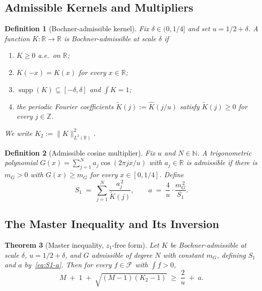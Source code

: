 \documentclass[11pt, letterpaper]{article}
\theoremstyle{paperplain}
\newtheorem{theorem}{Theorem}[section]
\theoremstyle{paperdef}
\newtheorem{definition}[theorem]{Definition}
\newcommand{\R}{\mathbb{R}}
\newcommand{\N}{\mathbb{N}}
\newcommand{\Z}{\mathbb{Z}}
\newcommand{\supp}{\operatorname{supp}}
\begin{document}
\subsection{Admissible Kernels and Multipliers}\label{subsec:mv-defs}

\begin{definition}[Bochner-admissible kernel]
\label{def:bochner}
Fix $\delta\in(0,1/4]$ and set $u=1/2+\delta$.  A function
$K:\R\to\R$ is \emph{Bochner-admissible at scale $\delta$} if
\begin{enumerate}[label=\textnormal{(K\arabic*)}, leftmargin=2.4em]
\item $K\ge 0$ a.e.\ on $\R$;
\item $K(-x)=K(x)$ for every $x\in\R$;
\item $\supp(K)\subseteq[-\delta,\delta]$ and $\int K=1$;
\item the periodic Fourier coefficients
      $\widetilde{K}(j):=\widehat{K}(j/u)$ satisfy
      $\widetilde{K}(j)\ge 0$ for every $j\in\Z$.
\end{enumerate}
We write $K_2:=\|K\|_{L^2(\R)}^2$.
\end{definition}

\begin{definition}[Admissible cosine multiplier]
\label{def:multiplier}
Fix $u$ and $N\in\N$.  A trigonometric polynomial
$G(x)=\sum_{j=1}^{N}a_j\cos(2\pi jx/u)$ with $a_j\in\R$ is
\emph{admissible} if there is $m_G>0$ with $G(x)\ge m_G$ for every
$x\in[0,1/4]$.  Define
\begin{equation}\label{eq:S1-a}
  S_1 \;=\; \sum_{j=1}^{N}\frac{a_j^{\,2}}{\widetilde{K}(j)},
  \qquad
  a \;=\; \frac{4}{u}\cdot\frac{m_G^{\,2}}{S_1}.
\end{equation}
\end{definition}

\subsection{The Master Inequality and Its Inversion}\label{subsec:mv-master}

\begin{theorem}[Master inequality, $z_1$-free form]
\label{thm:mv-master}
Let $K$ be Bochner-admissible at scale $\delta$, $u=1/2+\delta$,
and $G$ admissible of degree $N$ with constant $m_G$, defining $S_1$
and $a$ by~\eqref{eq:S1-a}.  Then for every $f\in\mathcal{F}$ with
$\int f>0$,
\begin{equation}\label{eq:master}
  M \;+\; 1 \;+\; \sqrt{(M-1)(K_2-1)}
  \;\ge\;
  \frac{2}{u} \;+\; a.
\end{equation}
\end{theorem}
\end{document}
